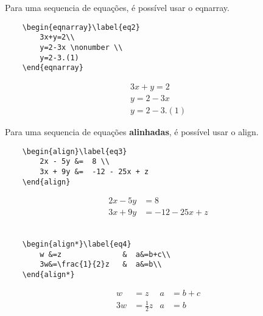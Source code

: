 \begin{frame}[fragile]
    Para uma sequencia de equações, é possível usar o {\code eqnarray}.

\vspace{0.5cm}
\begin{CenteredBox}
\begin{lstlisting}
    \begin{eqnarray}\label{eq2}
        3x+y=2\\
        y=2-3x \nonumber \\
        y=2-3.(1)
    \end{eqnarray}\end{lstlisting}
\end{CenteredBox}

    \begin{eqnarray}\label{eq2}
        3x+y=2\\
        y=2-3x \nonumber \\
        y=2-3.(1)
    \end{eqnarray}
\end{frame}

\begin{frame}[fragile]
    Para uma sequencia de equações \textbf{alinhadas}, é possível usar o {\code align}.

\vspace{0.5cm}
\begin{CenteredBox}
\begin{lstlisting}
    \begin{align}\label{eq3}
        2x - 5y &=  8 \\ 
        3x + 9y &=  -12 - 25x + z
    \end{align}
\end{lstlisting}
\end{CenteredBox}

    \begin{align}\label{eq3}
        2x - 5y &=  8 \\ 
        3x + 9y &=  -12 - 25x + z
    \end{align}
\hrulefill\\

\vspace{0.5cm}
\begin{CenteredBox}
\begin{lstlisting}
    \begin{align*}\label{eq4}
        w &=z              &  a&=b+c\\
        3w&=\frac{1}{2}z   &  a&=b\\
    \end{align*}
\end{lstlisting}
\end{CenteredBox}

    \begin{align*}\label{eq4}
        w &=z              &  a&=b+c\\
        3w&=\frac{1}{2}z   &  a&=b
    \end{align*}

\end{frame}


